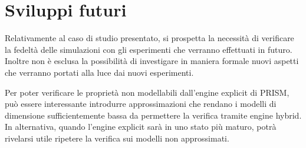 	\section{Sviluppi futuri}
	Relativamente al caso di studio presentato, si prospetta la necessit\`a di verificare la fedelt\`a delle simulazioni con gli esperimenti che verranno effettuati in futuro.
	Inoltre non \`e esclusa la possibilit\`a di investigare in maniera formale nuovi aspetti che verranno portati alla luce dai nuovi esperimenti.
	
	Per poter verificare le propriet\`a non modellabili dall'engine explicit di PRISM, pu\`o essere interessante introdurre approssimazioni che rendano i modelli di dimensione sufficientemente bassa da permettere la verifica tramite engine hybrid.
	In alternativa, quando l'engine explicit sar\`a in uno stato pi\`u maturo, potr\`a rivelarsi utile ripetere la verifica sui modelli non approssimati.